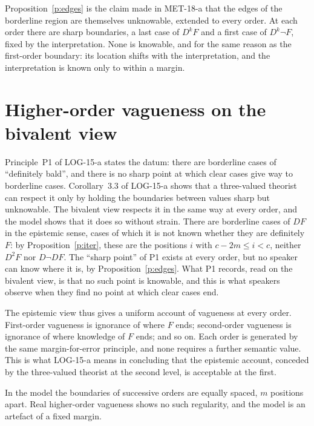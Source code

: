 \documentclass{situationist-preprint}
\begin{document}
Proposition~\ref{p:edges} is the claim made in MET-18-a that the edges of the borderline region are themselves unknowable, extended to every order. At each order there are sharp boundaries, a last case of $D^k F$ and a first case of $D^k \neg F$, fixed by the interpretation. None is knowable, and for the same reason as the first-order boundary: its location shifts with the interpretation, and the interpretation is known only to within a margin.

\section{Higher-order vagueness on the bivalent view}

Principle~P1 of LOG-15-a states the datum: there are borderline cases of \enquote{definitely bald}, and there is no sharp point at which clear cases give way to borderline cases. Corollary~3.3 of LOG-15-a shows that a three-valued theorist can respect it only by holding the boundaries between values sharp but unknowable. The bivalent view respects it in the same way at every order, and the model shows that it does so without strain. There are borderline cases of $DF$ in the epistemic sense, cases of which it is not known whether they are definitely $F$: by Proposition~\ref{p:iter}, these are the positions $i$ with $c - 2m \leq i < c$, neither $D^2F$ nor $D\neg DF$. The \enquote{sharp point} of P1 exists at every order, but no speaker can know where it is, by Proposition~\ref{p:edges}. What P1 records, read on the bivalent view, is that no such point is knowable, and this is what speakers observe when they find no point at which clear cases end.

The epistemic view thus gives a uniform account of vagueness at every order. First-order vagueness is ignorance of where $F$ ends; second-order vagueness is ignorance of where knowledge of $F$ ends; and so on. Each order is generated by the same margin-for-error principle, and none requires a further semantic value. This is what LOG-15-a means in concluding that the epistemic account, conceded by the three-valued theorist at the second level, is acceptable at the first.

\begin{objection}[Regularity]
In the model the boundaries of successive orders are equally spaced, $m$ positions apart. Real higher-order vagueness shows no such regularity, and the model is an artefact of a fixed margin.
\end{objection}
\end{document}
